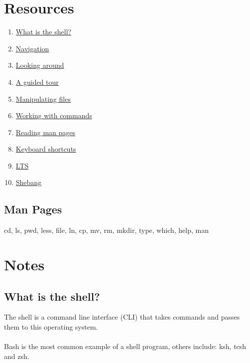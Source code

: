 \documentclass[12pt, letterpaper]{report}
\begin{document}
\section{Resources}
\begin{enumerate}
	\item \href{http://linuxcommand.org/lc3_lts0010.php}{What is the shell?}
	\item \href{https://intranet.alxswe.com/rltoken/iblidp7yp6i-QpT8rDXHaA}{Navigation}
	\item \href{https://intranet.alxswe.com/rltoken/xEKUCnQsMH0esQ6fJU5vLA}{Looking around}
	\item \href{https://intranet.alxswe.com/rltoken/HUhQ73fFR1GOC5nb4r-mDw}{A guided tour}
	\item \href{https://intranet.alxswe.com/rltoken/olv-1tj4d1LA57Z0PrLNvw}{Manipulating files}
	\item \href{https://intranet.alxswe.com/rltoken/zUtux3Pm0BkvtwXzbTtkmA}{Working with commands}
	\item \href{https://intranet.alxswe.com/rltoken/rddGdsqLf8_kRzp12RaD4A}{Reading man pages}
	\item \href{https://intranet.alxswe.com/rltoken/AGxMxuS5IeW8VmEvJyhwvw}{Keyboard shortcuts}
	\item \href{https://wiki.ubuntu.com/LTS}{LTS}
	\item \href{https://intranet.alxswe.com/rltoken/cE8ZA3kgEaFhB-IDNv31bQ}{Shebang}
\end{enumerate}

\subsection*{Man Pages}
cd, ls, pwd, less, file, ln, cp, mv, rm, mkdir, type, which, help, man

\clearpage
\section{Notes}

\subsection{What is the shell?}
The shell is a command line interface (CLI) that takes commands and passes them
to this operating system.\\\\

Bash is the most common example of a shell program, others include: ksh, tcsh
and zsh.\\
\end{document}
